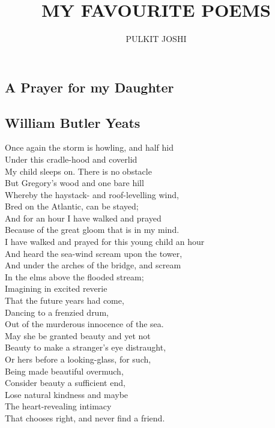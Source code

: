 \documentclass[a4,12pt]{article}
\title{\textbf{MY FAVOURITE POEMS}}
\author{PULKIT JOSHI}
\date{}
\begin{document}
    \maketitle
    \begin{center}
    \newpage
    \tableofcontents
    
        

        \newpage
        \section{A Prayer for my Daughter}
        \subsection*{William Butler Yeats}

        \vspace{15pt}
        Once again the storm is howling, and half hid\\
        Under this cradle-hood and coverlid\\
        My child sleeps on. There is no obstacle\\
        But Gregory's wood and one bare hill\\
        Whereby the haystack- and roof-levelling wind,\\
        Bred on the Atlantic, can be stayed;\\
        And for an hour I have walked and prayed\\
        Because of the great gloom that is in my mind.\\
        
        \vspace{15pt}
        I have walked and prayed for this young child an hour\\
        And heard the sea-wind scream upon the tower,\\
        And under the arches of the bridge, and scream\\
        In the elms above the flooded stream;\\
        Imagining in excited reverie\\
        That the future years had come,\\
        Dancing to a frenzied drum,\\
        Out of the murderous innocence of the sea.\\
       
        \vspace{15pt}
        May she be granted beauty and yet not\\
        Beauty to make a stranger's eye distraught,\\
        Or hers before a looking-glass, for such,\\
        Being made beautiful overmuch,\\
        Consider beauty a sufficient end,\\
        Lose natural kindness and maybe\\
        The heart-revealing intimacy\\
        That chooses right, and never find a friend.\\


\end{center}
\end{document}
